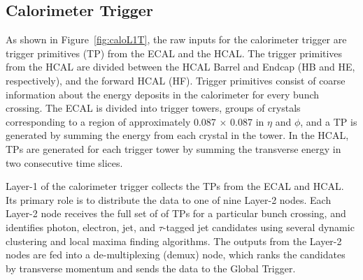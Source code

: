 
\subsection{Calorimeter Trigger}
As shown in Figure~\ref{fig:caloL1T}, the raw inputs for the calorimeter trigger are trigger primitives (TP) from the ECAL and the HCAL. The trigger primitives from the HCAL are divided between the HCAL Barrel and Endcap (HB and HE, respectively), and the forward HCAL (HF). Trigger primitives consist of coarse information about the energy deposits  in the calorimeter for every bunch crossing. The ECAL is divided into trigger towers, groups of crystals corresponding to a region of approximately 0.087 $\times$ 0.087 in $\eta$ and $\phi$, and a TP is generated by summing the energy from each crystal in the tower. In the HCAL, TPs are generated for each trigger tower by summing the transverse energy in two consecutive time slices. 

Layer-1 of the calorimeter trigger collects the TPs from the ECAL and HCAL. Its primary role is to distribute the data to one of nine Layer-2 nodes. Each Layer-2 node receives the full set of of TPs for a particular bunch crossing, and identifies photon, electron, jet, and $\tau$-tagged jet candidates using several dynamic clustering and local maxima finding algorithms. The outputs from the Layer-2 nodes are fed into a de-multiplexing (demux) node, which ranks the candidates by transverse momentum and sends the data to the Global Trigger. 


